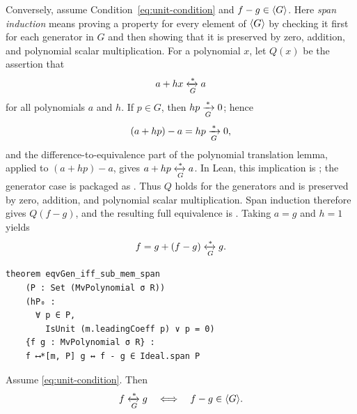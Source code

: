 Conversely, assume Condition~\eqref{eq:unit-condition} and
$f-g\in\langle G \rangle$.  Here \emph{span induction} means proving a property for
every element of $\langle G \rangle$ by checking it first for each generator in $G$
and then showing that it is preserved by zero, addition, and polynomial
scalar multiplication.  For a polynomial $x$, let $Q(x)$ be the assertion
that
\[
  a+hx\xleftrightarrow[G]{*}a
\]
for all polynomials $a$ and $h$.  If $p\in G$, then
$hp\xrightarrow[G]{*}0$; hence
\[
  (a+hp)-a=hp\xrightarrow[G]{*}0,
\]
and the difference-to-equivalence part of the polynomial translation lemma,
applied to $(a+hp)-a$, gives $a+hp\xleftrightarrow[G]{*}a$.  In Lean, this implication is
; the generator case is
packaged as .  Thus $Q$ holds for the
generators and is preserved by zero, addition, and polynomial scalar
multiplication.  Span induction therefore gives $Q(f-g)$, and the resulting
full equivalence is
.
Taking
$a=g$ and $h=1$ yields
\[
  f=g+(f-g)\xleftrightarrow[G]{*}g.
\]

\begin{lstlisting}[style=lean,caption={Reduction equivalence coincides with congruence modulo the generated ideal.},label={lst:translation}]
theorem eqvGen_iff_sub_mem_span
    (P : Set (MvPolynomial σ R))
    (hP₀ :
      ∀ p ∈ P,
        IsUnit (m.leadingCoeff p) ∨ p = 0)
    {f g : MvPolynomial σ R} :
    f ⟷*[m, P] g ↔ f - g ∈ Ideal.span P
\end{lstlisting}

\begin{theorem}\label{thm:translation}
Assume \eqref{eq:unit-condition}.  Then
\[
  f\xleftrightarrow[G]{*}g
  \quad\Longleftrightarrow\quad
  f-g\in\langle G \rangle.
\]
\end{theorem}
